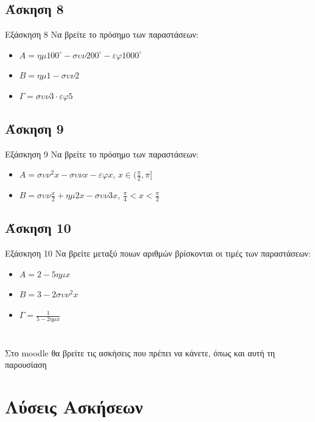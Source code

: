 \documentclass[greek]{beamer}
\begin{document}
\subsection{Άσκηση 8}
\begin{frame}[label=Άσκηση8]{Εξάσκηση 8}
 Να βρείτε το πρόσημο των παραστάσεων:
 \begin{itemize}
  \item<1-> $Α=ημ100^{\circ}-συν200^{\circ}-εφ1000^{\circ}$
  \item<2-> $Β=ημ1-συν2$
  \item<3-> $Γ=συν3 \cdot εφ5$
 \end{itemize}

\end{frame}

\subsection{Άσκηση 9}
\begin{frame}[label=Άσκηση9]{Εξάσκηση 9}
 Να βρείτε το πρόσημο των παραστάσεων:
 \begin{itemize}
  \item<1-> $Α=συν^2x-συνx-εφx$, $x\in (\frac{π}{2},π]$
  \item<2-> $Β=συν\frac{x}{2}+ημ2x-συν3x$, $\frac{π}{4}<x<\frac{π}{2}$
 \end{itemize}

\end{frame}

\subsection{Άσκηση 10}
\begin{frame}[label=Άσκηση10]{Εξάσκηση 10}
 Να βρείτε μεταξύ ποιων αριθμών βρίσκονται οι τιμές των παραστάσεων:
 \begin{itemize}
  \item<1-> $Α=2-5ημx$
  \item<2-> $Β=3-2συν^2x$
  \item<3-> $Γ=\frac{1}{5-2ημx}$
 \end{itemize}

\end{frame}

\section{}
\begin{frame}
 Στο moodle θα βρείτε τις ασκήσεις που πρέπει να κάνετε, όπως και αυτή τη παρουσίαση
\end{frame}

\appendix
\section{Λύσεις Ασκήσεων}
\begin{frame}
 \tableofcontents
\end{frame}
\end{document}
